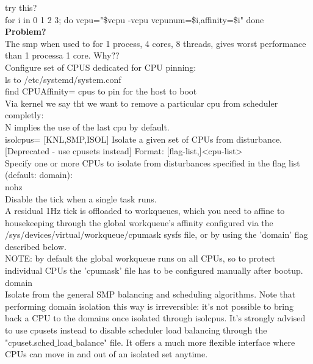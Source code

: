 \documentclass[11pt, a4paper, oneside]{article}
\theoremstyle{definition}
\begin{document}
try this?\\
for i in 0 1 2 3; do
    vcpu="\$vcpu -vcpu vcpunum=\$i,affinity=\$i"
done\\

\textbf{Problem?}\\
The smp when used to for 1 process, 4 cores, 8 threads, gives worst performance than 1 processa 1 core. Why??\\

Configure set of CPUS dedicated for CPU pinning:\\
ls to /etc/systemd/system.conf\\
find CPUAffinity= cpus to pin for the host to boot\\

Via kernel we say tht we want to remove a particular cpu from scheduler completly:\\
N implies the use of the last cpu by default.\\
isolcpus=       [KNL,SMP,ISOL] Isolate a given set of CPUs from disturbance.
                        [Deprecated - use cpusets instead]
                        Format: [flag-list,]<cpu-list>\\

                        Specify one or more CPUs to isolate from disturbances
                        specified in the flag list (default: domain):\\

                        nohz\\
                          Disable the tick when a single task runs.\\

                          A residual 1Hz tick is offloaded to workqueues, which you
                          need to affine to housekeeping through the global
                          workqueue's affinity configured via the
                          /sys/devices/virtual/workqueue/cpumask sysfs file, or
                          by using the 'domain' flag described below.\\

                          NOTE: by default the global workqueue runs on all CPUs,
                          so to protect individual CPUs the 'cpumask' file has to
                          be configured manually after bootup.\\

                        domain\\
                          Isolate from the general SMP balancing and scheduling
                          algorithms. Note that performing domain isolation this way
                          is irreversible: it's not possible to bring back a CPU to
                          the domains once isolated through isolcpus. It's strongly
                          advised to use cpusets instead to disable scheduler load
                          balancing through the "cpuset.sched$\_$load$\_$balance" file.
                          It offers a much more flexible interface where CPUs can
                          move in and out of an isolated set anytime.\\
\end{document}
